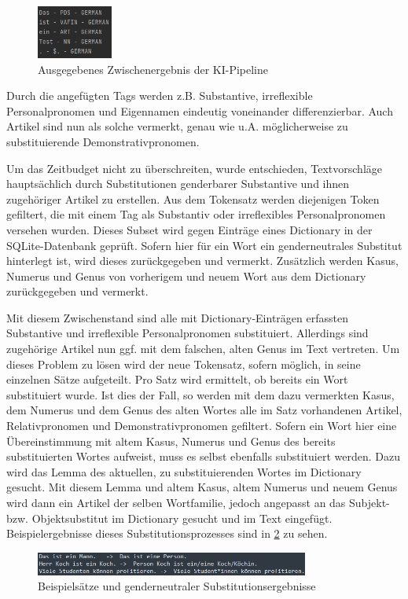 \begin{figure}[!th]
\centering
\includegraphics[width=2.5cm]{Resources/POS.PNG}
\caption{Ausgegebenes Zwischenergebnis der KI-Pipeline}
\label{fig:pos}
\end{figure}

Durch die angefügten Tags werden z.B. Substantive, irreflexible Personalpronomen und Eigennamen eindeutig voneinander differenzierbar. Auch Artikel sind nun als solche vermerkt, genau wie u.A. möglicherweise zu substituierende Demonstrativpronomen.

Um das Zeitbudget nicht zu überschreiten, wurde entschieden, Textvorschläge hauptsächlich durch Substitutionen genderbarer Substantive und ihnen zugehöriger Artikel zu erstellen. Aus dem Tokensatz werden diejenigen Token gefiltert, die mit einem Tag als Substantiv oder irreflexibles Personalpronomen versehen wurden. Dieses Subset wird gegen Einträge eines Dictionary in der SQLite-Datenbank geprüft. Sofern hier für ein Wort ein genderneutrales Substitut hinterlegt ist, wird dieses zurückgegeben und vermerkt. Zusätzlich werden Kasus, Numerus und Genus von vorherigem und neuem Wort aus dem Dictionary zurückgegeben und vermerkt.

Mit diesem Zwischenstand sind alle mit Dictionary-Einträgen erfassten Substantive und irreflexible Personalpronomen substituiert. Allerdings sind zugehörige Artikel nun ggf. mit dem falschen, alten Genus im Text vertreten. Um dieses Problem zu lösen wird der neue Tokensatz, sofern möglich, in seine einzelnen Sätze aufgeteilt. Pro Satz wird ermittelt, ob bereits ein Wort substituiert wurde. Ist dies der Fall, so werden mit dem dazu vermerkten Kasus, dem Numerus und dem Genus des alten Wortes alle im Satz vorhandenen Artikel, Relativpronomen und Demonstrativpronomen gefiltert. Sofern ein Wort hier eine Übereinstimmung mit altem Kasus, Numerus und Genus des bereits substituierten Wortes aufweist, muss es selbst ebenfalls substituiert werden. Dazu wird das Lemma des aktuellen, zu substituierenden Wortes im Dictionary gesucht. Mit diesem Lemma und altem Kasus, altem Numerus und neuem Genus wird dann ein Artikel der selben Wortfamilie, jedoch angepasst an das Subjekt- bzw. Objektsubstitut im Dictionary gesucht und im Text eingefügt. Beispielergebnisse dieses Substitutionsprozesses sind in \ref{fig:substitute} zu sehen.

\begin{figure}[!th]
\centering
\includegraphics[width=9cm]{Resources/Substitution.PNG}
\caption{Beispielsätze und genderneutraler Substitutionsergebnisse}
\label{fig:substitute}
\end{figure}
